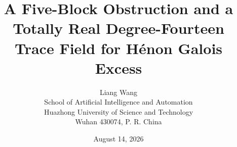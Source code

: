 \documentclass[11pt]{article}
\title{A Five-Block Obstruction and a Totally Real Degree-Fourteen\\
Trace Field for H\'enon Galois Excess}
\author{Liang Wang\\
\small School of Artificial Intelligence and Automation\\[-1mm]
\small Huazhong University of Science and Technology\\[-1mm]
\small Wuhan 430074, P. R. China}
\date{August 14, 2026}
\theoremstyle{remark}
\begin{document}
\maketitle












\renewcommand{\bibfont}{\small}


\end{document}
